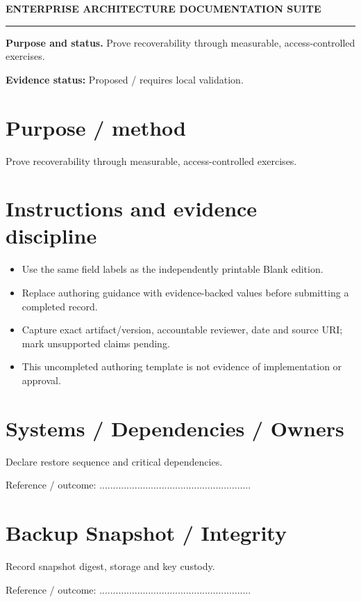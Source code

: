 \documentclass[10pt,letterpaper]{article}
\begin{document}
\begin{center}
{\large\bfseries\color{teal} ENTERPRISE ARCHITECTURE DOCUMENTATION SUITE}\par
{}\par
{}\par
\end{center}
\vspace{8pt}\hrule\vspace{12pt}
\textbf{Purpose and status.} Prove recoverability through measurable, access-controlled exercises.\par
\textbf{Evidence status:} Proposed / requires local validation.\par
\section{Purpose / method}
Prove recoverability through measurable, access-controlled exercises.\par
\section{Instructions and evidence discipline}
\begin{itemize}
\item Use the same field labels as the independently printable Blank edition.
\item Replace authoring guidance with evidence-backed values before submitting a completed record.
\item Capture exact artifact/version, accountable reviewer, date and source URI; mark unsupported claims pending.
\item This uncompleted authoring template is not evidence of implementation or approval.
\end{itemize}
\section{Systems / Dependencies / Owners}
Declare restore sequence and critical dependencies.\par
Reference / outcome: ........................................................\par
\section{Backup Snapshot / Integrity}
Record snapshot digest, storage and key custody.\par
Reference / outcome: ........................................................\par
\end{document}
